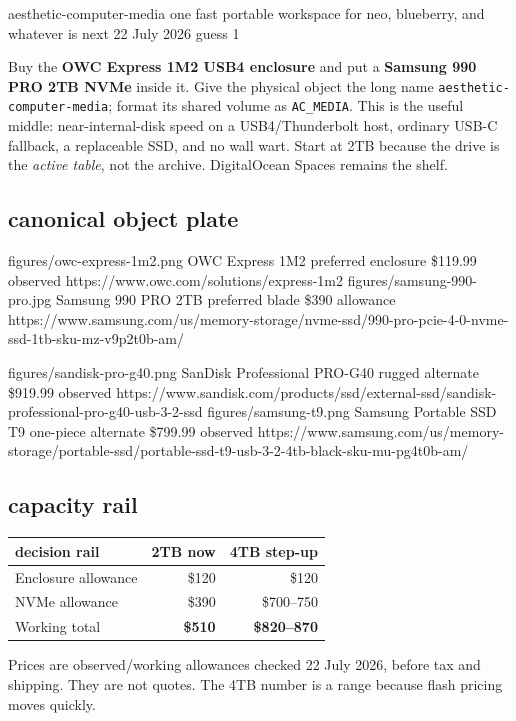 \documentclass[10pt,letterpaper]{article}
\begin{document}
\gearGuessTitle
  {aesthetic-computer-media}
  {one fast portable workspace for neo, blueberry, and whatever is next}
  {22 July 2026}
  {guess 1}

\begin{bestguess}
Buy the \textbf{OWC Express 1M2 USB4 enclosure} and put a
\textbf{Samsung 990 PRO 2TB NVMe} inside it. Give the physical object the long
name \texttt{aesthetic-computer-media}; format its shared volume as
\texttt{AC\_MEDIA}. This is the useful middle: near-internal-disk speed on a
USB4/Thunderbolt host, ordinary USB-C fallback, a replaceable SSD, and no wall
wart. Start at 2TB because the drive is the \emph{active table}, not the archive.
DigitalOcean Spaces remains the shelf.
\end{bestguess}

\subsection{canonical object plate}
\gearproduct
  {figures/owc-express-1m2.png}
  {OWC Express 1M2}
  {preferred enclosure}
  {\$119.99 observed}
  {https://www.owc.com/solutions/express-1m2}
  {\buyOWCExpressOneMTwo}
\hfill
\gearproduct
  {figures/samsung-990-pro.jpg}
  {Samsung 990 PRO 2TB}
  {preferred blade}
  {\$390 allowance}
  {https://www.samsung.com/us/memory-storage/nvme-ssd/990-pro-pcie-4-0-nvme-ssd-1tb-sku-mz-v9p2t0b-am/}
  {\buySamsungNineNineZeroPro}

\vspace{0.12in}
\gearproduct
  {figures/sandisk-pro-g40.png}
  {SanDisk Professional PRO-G40}
  {rugged alternate}
  {\$919.99 observed}
  {https://www.sandisk.com/products/ssd/external-ssd/sandisk-professional-pro-g40-usb-3-2-ssd}
  {\buySanDiskProGForty}
\hfill
\gearproduct
  {figures/samsung-t9.png}
  {Samsung Portable SSD T9}
  {one-piece alternate}
  {\$799.99 observed}
  {https://www.samsung.com/us/memory-storage/portable-ssd/portable-ssd-t9-usb-3-2-4tb-black-sku-mu-pg4t0b-am/}
  {\buySamsungTNine}

\gearaffiliatedisclosure

\subsection{capacity rail}

\begin{tabularx}{\linewidth}{@{}Y R R@{}}
\toprule
\textbf{decision rail} & \textbf{2TB now} & \textbf{4TB step-up} \\
\midrule
Enclosure allowance & \$120 & \$120 \\
NVMe allowance & \$390 & \$700--750 \\
Working total & \textbf{\$510} & \textbf{\$820--870} \\
\bottomrule
\end{tabularx}
{\footnotesize\color{acgray}Prices are observed/working allowances checked 22 July 2026, before tax and shipping. They are not quotes. The 4TB number is a range because flash pricing moves quickly.}
\end{document}
